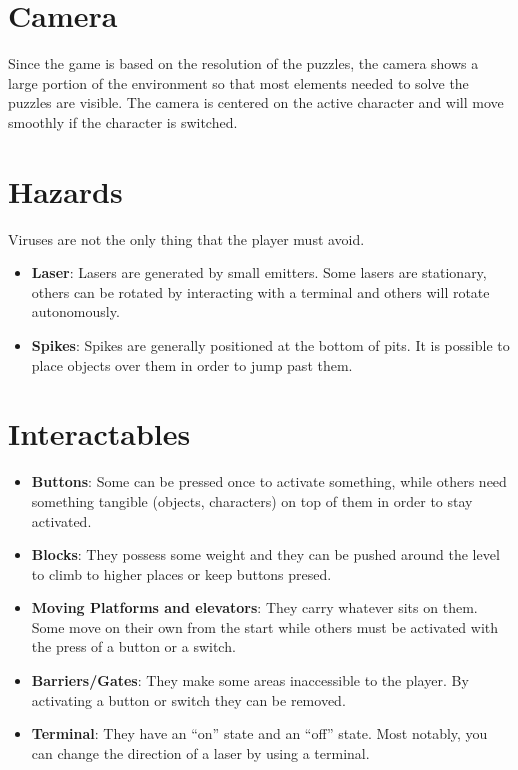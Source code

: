 \documentclass[12pt, a4paper]{report}
\begin{document}
\section*{Camera}

Since the game is based on the resolution of the puzzles, the camera shows a large portion of the environment so that most elements needed to solve the puzzles are visible. The camera is centered on the active character and will move smoothly if the character is switched.

\section*{Hazards}
Viruses are not the only thing that the player must avoid.
\begin{itemize}
  \item \textbf{Laser}: Lasers are generated by small emitters. Some lasers are stationary, others can be rotated by interacting with a terminal and others will rotate autonomously. 
  \item \textbf{Spikes}: Spikes are generally positioned at the bottom of pits. It is possible to place objects over them in order to jump past them.
\end{itemize}

\section*{Interactables}
\begin{itemize}
	\item \textbf{Buttons}: Some can be pressed once to activate something, while others need something tangible (objects, characters) on top of them in order to stay activated.
	\item \textbf{Blocks}: They possess some weight and they can be pushed around the level to climb to higher places or keep buttons presed.
	\item \textbf{Moving Platforms and elevators}: They carry whatever sits on them. Some move on their own from the start while others must be activated with the press of a button or a switch.
	\item \textbf{Barriers/Gates}: They make some areas inaccessible to the player. By activating a button or switch they can be removed.
	\item \textbf{Terminal}: They have an “on” state and an “off” state. Most notably, you can change the direction of a laser by using a terminal.
\end{itemize}
\end{document}
